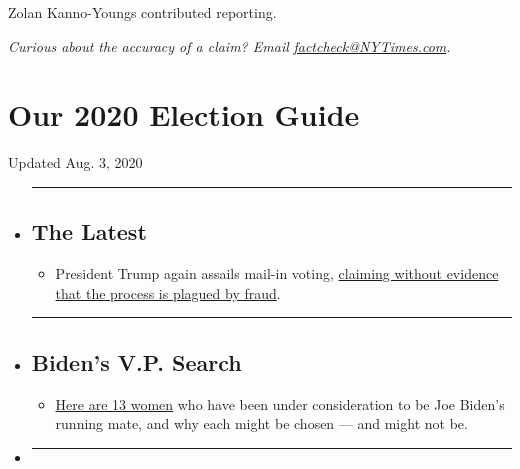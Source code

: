 Zolan Kanno-Youngs contributed reporting.

\emph{Curious about the accuracy of a claim? Email}
\href{mailto:factcheck@NYTimes.com}{\emph{factcheck@NYTimes.com}}\emph{.}

\hypertarget{our-2020-election-guide}{%
\section{Our 2020 Election Guide}\label{our-2020-election-guide}}

Updated Aug. 3, 2020

\begin{itemize}
\item
  \begin{center}\rule{0.5\linewidth}{\linethickness}\end{center}

  \hypertarget{the-latest}{%
  \subsection{The Latest}\label{the-latest}}

  \begin{itemize}
  \tightlist
  \item
    President Trump again assails mail-in voting,
    \href{https://www.nytimes3xbfgragh.onion/2020/08/03/us/politics/trump-mail-in-voting.html?action=click\&pgtype=Article\&state=default\&region=BELOW_MAIN_CONTENT\&context=storylines_guide}{claiming
    without evidence that the process is plagued by fraud}.
  \end{itemize}
\item
  \begin{center}\rule{0.5\linewidth}{\linethickness}\end{center}

  \hypertarget{bidens-vp-search}{%
  \subsection{Biden's V.P. Search}\label{bidens-vp-search}}

  \begin{itemize}
  \tightlist
  \item
    \href{https://www.nytimes3xbfgragh.onion/article/biden-vice-president-2020.html?action=click\&pgtype=Article\&state=default\&region=BELOW_MAIN_CONTENT\&context=storylines_guide}{Here
    are 13 women} who have been under consideration to be Joe Biden's
    running mate, and why each might be chosen --- and might not be.
  \end{itemize}
\item
  \begin{center}\rule{0.5\linewidth}{\linethickness}\end{center}


\end{itemize}
